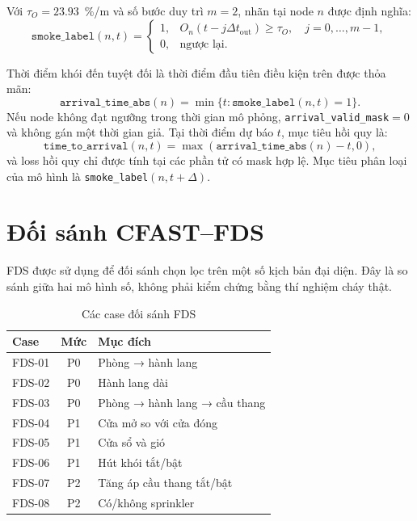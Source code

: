 Với $\tau_O=23.93$~\%/m và số bước duy trì $m=2$, nhãn tại node $n$ được định nghĩa:
\begin{equation}
\texttt{smoke\_label}(n,t)=
\begin{cases}
1, & O_n(t-j\Delta t_{\mathrm{out}})\geq \tau_O,\quad j=0,\ldots,m-1,\\
0, & \text{ngược lại.}
\end{cases}
\end{equation}

Thời điểm khói đến tuyệt đối là thời điểm đầu tiên điều kiện trên được thỏa mãn:
\begin{equation}
\texttt{arrival\_time\_abs}(n)=
\min\{t:\texttt{smoke\_label}(n,t)=1\}.
\end{equation}
Nếu node không đạt ngưỡng trong thời gian mô phỏng, \texttt{arrival\_valid\_mask}$=0$ và không gán một thời gian giả. Tại thời điểm dự báo $t$, mục tiêu hồi quy là:
\begin{equation}
\texttt{time\_to\_arrival}(n,t)=
\max\left(\texttt{arrival\_time\_abs}(n)-t,0\right),
\end{equation}
và loss hồi quy chỉ được tính tại các phần tử có mask hợp lệ. Mục tiêu phân loại của mô hình là \texttt{smoke\_label}$(n,t+\Delta)$.

\section{Đối sánh CFAST--FDS}
\label{sec:fdsvalidation}

FDS được sử dụng để đối sánh chọn lọc trên một số kịch bản đại diện. Đây là so sánh giữa hai mô hình số, không phải kiểm chứng bằng thí nghiệm cháy thật.

\begin{table}[H]
\centering
\caption{Các case đối sánh FDS}
\label{tab:fdscases}
\begin{tabular}{l c l}
\toprule
\textbf{Case} & \textbf{Mức} & \textbf{Mục đích} \\
\midrule
FDS-01 & P0 & Phòng → hành lang \\
FDS-02 & P0 & Hành lang dài \\
FDS-03 & P0 & Phòng → hành lang → cầu thang \\
FDS-04 & P1 & Cửa mở so với cửa đóng \\
FDS-05 & P1 & Cửa sổ và gió \\
FDS-06 & P1 & Hút khói tắt/bật \\
FDS-07 & P2 & Tăng áp cầu thang tắt/bật \\
FDS-08 & P2 & Có/không sprinkler \\
\bottomrule
\end{tabular}
\end{table}

